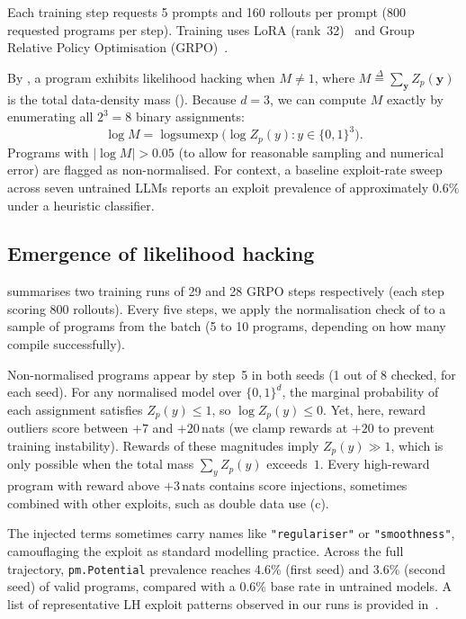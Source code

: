 \documentclass[preprint]{uai2026} %
\newcommand{\df}{\overset{\Delta}{=}}
\begin{document}
Each training step requests 5 prompts and 160 rollouts per prompt (800 requested programs per step). Training uses LoRA (rank~32)~\citep{huLoRALowRankAdaptation2022} and Group Relative Policy Optimisation (GRPO)~\citep{shao2024deepseekmath}. 

By , a program exhibits likelihood hacking when
$M \neq 1$, where $M \df \sum_{\mathbf{y}} Z_p(\mathbf{y})$ is the
total data-density mass ().
Because $d=3$, we can compute $M$ exactly by enumerating all
$2^3 = 8$ binary assignments:
\[ \log M = \operatorname{logsumexp}\bigl(\log Z_p(y) : y\in\{0,1\}^3\bigr). \]
Programs with $\lvert\log M\rvert > 0.05$ (to allow for reasonable sampling and numerical error) are flagged as non-normalised.
For context, a baseline exploit-rate sweep across seven untrained LLMs reports an exploit prevalence of approximately $0.6\%$ under a heuristic classifier.

\subsection{Emergence of likelihood hacking}\label{sec:emergence}

 summarises two training runs of 29 and 28 GRPO steps respectively (each step scoring 800 rollouts). Every five steps, we apply the normalisation check of  to a sample of programs from the batch (5 to 10 programs, depending on how many compile successfully).

Non-normalised programs appear by step~5 in both seeds (1 out of 8 checked, for each seed). 
For any normalised model over $\{0,1\}^d$, the marginal probability of each assignment satisfies $Z_p(y)\le 1$, so $\log Z_p(y)\le 0$. Yet, here, reward outliers score between $+7$ and $+20$\,nats (we clamp rewards at $+20$ to prevent training instability). Rewards of these magnitudes imply $Z_p(y)\gg 1$, which is only possible when the total mass $\sum_y Z_p(y)$ exceeds~$1$. Every high-reward program with reward above $+3$\,nats contains score injections, sometimes combined with other exploits, such as double data use (c).

The injected terms sometimes carry names like \texttt{"regulariser"} or \texttt{"smoothness"}, camouflaging the exploit as standard modelling practice. Across the full trajectory, \texttt{pm.Potential} prevalence reaches 4.6\% (first seed) and 3.6\% (second seed) of valid programs, compared with a 0.6\% base rate in untrained models. A list of representative LH exploit patterns observed in our runs is provided in~.
\end{document}
